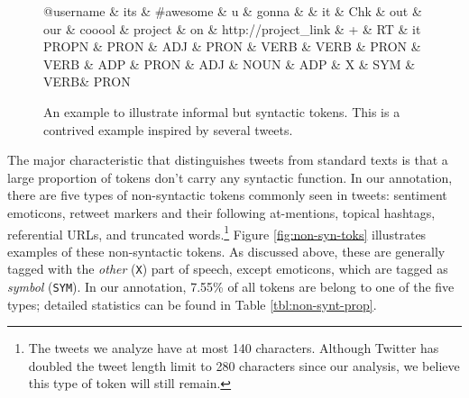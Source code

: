 \documentclass[11pt,a4paper]{article}
\begin{document}
\begin{figure*}[t]
	\centering
	\small
	\begin{dependency}[edge slant=2, text only label, label style=above]
		\begin{deptext}
			@username \& its \& \#awesome \& u \& gonna \&  \& it \& Chk \& out \& our \& cooool \& project \& on \& http://project\_link \& + \& RT \& it\\
			\tiny PROPN \& \tiny PRON \& \tiny ADJ \& \tiny PRON \& \tiny VERB \& \tiny VERB \& \tiny PRON \& \tiny VERB \& \tiny ADP \& \tiny PRON \& \tiny ADJ \& \tiny NOUN \& \tiny ADP \& \tiny X \& \tiny SYM \& \tiny VERB\& \tiny PRON\\
		\end{deptext}
	\end{dependency}
	\caption{An example to illustrate informal but syntactic tokens.
		This is a contrived example inspired by several tweets.}\label{fig:informal-toks}
\end{figure*}

The major characteristic that distinguishes tweets from standard texts is that
a large proportion of tokens don't carry any syntactic function. 
In our annotation, there are five types of non-syntactic tokens commonly seen in tweets: sentiment emoticons, retweet markers and their following at-mentions, topical hashtags, referential URLs, and
truncated words.\footnote{The tweets we analyze have at most 140
  characters. Although Twitter has doubled the tweet length limit to
  280 characters since our analysis, we believe this type of token
  will still remain.}  Figure \ref{fig:non-syn-toks} illustrates examples of
these non-syntactic tokens.  As discussed above, these are generally
tagged with the \emph{other} (\texttt{X}) part of speech, except
emoticons, which are tagged as \emph{symbol} (\texttt{SYM}).  In our annotation, 
7.55\% of all tokens are belong to one of the five types; detailed statistics can be found in Table \ref{tbl:non-synt-prop}.
\end{document}
